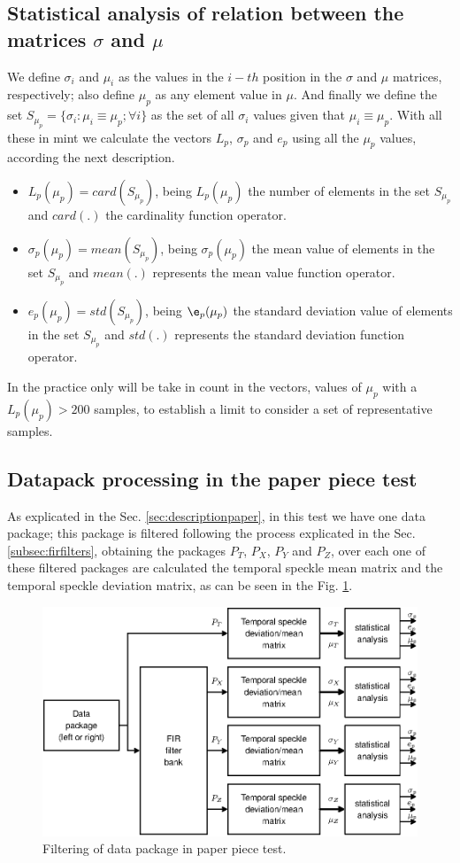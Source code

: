 \documentclass[review]{elsarticle}
\begin{document}
\subsection{Statistical analysis of relation between the matrices $\sigma$ and $\mu$}
\label{subsec:statistical}
We define $\sigma_i$ and $\mu_i$
as the values in the $i-th$ position in the $\sigma$  
and $\mu$ matrices, respectively; also define $\mu_p$
as any element value in  $\mu$.
And finally we define the set $S_{\mu_p}=\{\sigma_i: \mu_i\equiv \mu_p; \forall i\}$
as the set of all $\sigma_i$  values given that $\mu_i\equiv\mu_p$.
With all these in mint we calculate the vectors $L_p$, $\sigma_p$ and
$e_p$ using all the $\mu_p$ values, according the next description.
\begin{itemize}
 \item $L_p(\mu_p)=card\left(S_{\mu_p}\right)$,  being $L_p(\mu_p)$ the number of elements
 in the set $S_{\mu_p}$ and $card(.)$ the cardinality function operator.
 \item $\sigma_p(\mu_p)=mean\left(S_{\mu_p}\right)$, being $\sigma_p(\mu_p)$
 the mean value of elements in the set $S_{\mu_p}$ and $mean(.)$ represents the mean value function operator.
 \item $e_p(\mu_p)=std\left(S_{\mu_p}\right)$, being $\e_p(\mu_p)$
 the standard  deviation value of elements in the set $S_{\mu_p}$ and $std(.)$ represents the standard deviation function operator.
\end{itemize}
In the practice only will be take in count in the vectors, values of $\mu_p$
with a $L_p(\mu_p)>200$ samples, to establish a limit to consider a set of representative samples.


\subsection{Datapack processing in the paper piece test }
\label{subsec:numprocink}

As explicated in the Sec. \ref{sec:descriptionpaper}, in this test we have one data package;
this package is filtered following the process explicated in the Sec. \ref{subsec:firfilters},
obtaining the packages $P_T$, $P_X$, $P_Y$ and $P_Z$,
over each one of these filtered packages 
are calculated the temporal speckle mean matrix and the 
temporal speckle deviation matrix, as can be seen in the Fig. \ref{fig:filtering2}.

\begin{figure}[h!]
\centering
\includegraphics[width=0.65\columnwidth]{filtering2.eps}
\caption{Filtering of data package in paper piece test.}
\label{fig:filtering2}
\end{figure}
\end{document}
